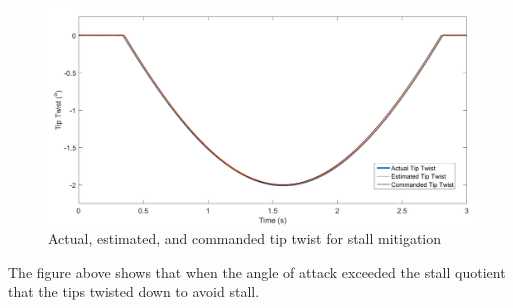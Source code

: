 \documentclass[11pt]{ucthesis}
\begin{document}
\begin{figure}[thpb]
\centering
\includegraphics[width=1\linewidth]{Figures/AuroraStallMitigationSimulation.png}
\caption{Actual, estimated, and commanded tip twist for stall mitigation}
\label{fig:APStall}
\end{figure}

The figure above shows that when the angle of attack exceeded the stall quotient that the tips twisted down to avoid stall.





\end{document}
